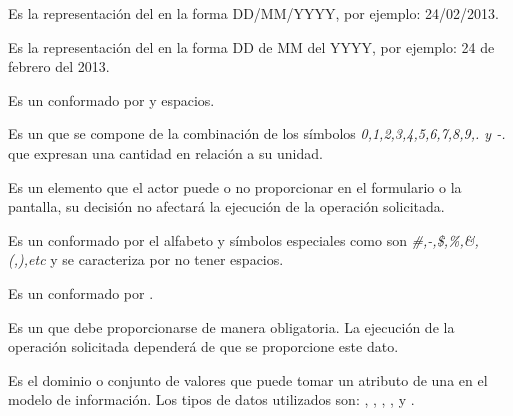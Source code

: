 \begin{description}
     Es la representación del   en la forma DD/MM/YYYY, por ejemplo: 24/02/2013.

     Es la representación del   en la forma DD de MM del YYYY, por ejemplo: 24 de febrero del 2013.

     Es un   conformado por  y espacios.
    
     Es un  que se compone de la combinación de los símbolos \textit{0,1,2,3,4,5,6,7,8,9,. y -.}  que expresan una cantidad en relación a su unidad.
    
     Es un elemento que el actor puede o no proporcionar en el formulario o la pantalla, su decisión no afectará la ejecución de la operación solicitada.

     Es un   conformado por el alfabeto y símbolos especiales como son \textit{\#,-,\$,\%,\&,(,),etc} y se caracteriza por no tener espacios.

     Es un   conformado por .

     Es un  que debe proporcionarse de manera obligatoria. La ejecución de la operación solicitada dependerá de que se proporcione este dato.
    

     Es el dominio o conjunto de valores que puede tomar un atributo de una  en el modelo de información. Los tipos de datos utilizados son: , , , ,  y .

\end{description}


